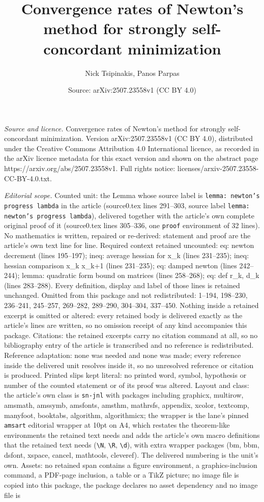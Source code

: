 \documentclass[10pt,a4paper]{amsart}
\title[Convergence rates of Newton's method for strongly self-conco]{Convergence rates of Newton's method for strongly self-concordant minimization}
\author{Nick Tsipinakis, Panos Parpas}
\date{Source: arXiv:2507.23558v1 (CC BY 4.0)}
\begin{document}
\maketitle

\noindent\emph{Source and licence.} Convergence rates of Newton's method for strongly self-concordant minimization. Version arXiv:2507.23558v1 (CC BY 4.0), distributed under the Creative Commons Attribution 4.0 International licence, as recorded in the arXiv licence metadata for this exact version and shown on the abstract page https://arxiv.org/abs/2507.23558v1. Full rights notice: licenses/arxiv-2507.23558-CC-BY-4.0.txt.\par\smallskip

\noindent\textit{Editorial scope.} Counted unit: the Lemma whose source label is \texttt{lemma: newton's progress lambda} in the article (source0.tex lines 291--303, source label \texttt{lemma: newton's progress lambda}), delivered together with the article's own complete original proof of it (source0.tex lines 305--336, one \texttt{proof} environment of 32 lines). No mathematics is written, repaired or re-derived: statement and proof are the article's own text line for line. Required context retained uncounted: eq: newton decrement (lines 195--197); ineq: average hessian for x\_k (lines 231--235); ineq: hessian comparison x\_k x\_k+1 (lines 231--235); eq: damped newton (lines 242--244); lemma: quadratic form bound on matrices (lines 258--268); eq: def r\_k, d\_k (lines 283--288). Every definition, display and label of those lines is retained unchanged. Omitted from this package and not redistributed: 1--194, 198--230, 236--241, 245--257, 269--282, 289--290, 304--304, 337--450. Nothing inside a retained excerpt is omitted or altered: every retained body is delivered exactly as the article's lines are written, so no omission receipt of any kind accompanies this package. Citations: the retained excerpts carry no citation command at all, so no bibliography entry of the article is transcribed and no reference is redistributed. Reference adaptation: none was needed and none was made; every reference inside the delivered unit resolves inside it, so no unresolved reference or citation is produced. Printed slips kept literal: no printed word, symbol, hypothesis or number of the counted statement or of its proof was altered. Layout and class: the article's own class is \texttt{sn-jnl} with packages including graphicx, multirow, amsmath, amssymb, amsfonts, amsthm, mathrsfs, appendix, xcolor, textcomp, manyfoot, booktabs, algorithm, algorithmicx; the wrapper is the lane's pinned \texttt{amsart} editorial wrapper at 10pt on A4, which restates the theorem-like environments the retained text needs and adds the article's own macro definitions that the retained text needs (\texttt{\textbackslash N}, \texttt{\textbackslash R}, \texttt{\textbackslash d}), with extra wrapper packages (bm, bbm, dsfont, xspace, cancel, mathtools, cleveref). The delivered numbering is the unit's own. Assets: no retained span contains a figure environment, a graphics-inclusion command, a PDF-page inclusion, a table or a TikZ picture; no image file is copied into this package, the package declares no asset dependency and no image file is 
\end{document}
